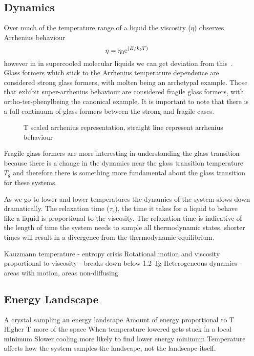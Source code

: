 \subsection{Dynamics}

Over much of the temperature range of a liquid the viscosity ($\eta$) observes Arrhenius behaviour
\begin{equation}
    \eta = \eta_0 \text{e}^{(E/k_bT)}
\end{equation}
however in in supercooled molecular liquids we can get deviation from this~. Glass formers which stick to the Arrhenius temperature dependence are considered strong glass formers, with molten  being an archetypal example. Those that exhibit super-arrhenius behaviour are considered fragile glass formers, with ortho-ter-phenyl\tocheck being the canonical example. It is important to note that there is a full continuum of glass formers between the strong and fragile cases.

\begin{figure}
    \caption{T scaled arrhenius representation, straight line represent arrhenius behaviour}
    \label{fig:angell}
\end{figure}

Fragile glass formers are more interesting in understanding the glass transition because there is a change in the dynamics near the glass transition temperature $T_g$ and therefore there is something more fundamental about the glass transition for these systems. 

As we go to lower and lower temperatures the dynamics of the system slows down dramatically. The relaxation time ($\tau_r$), the time it takes for a liquid to behave like a liquid is proportional to the viscosity. The relaxation time is indicative of the length of time the system needs to sample all thermodynamic states, shorter times will result in a divergence from the thermodynamic equilibrium.


Kauzmann temperature - entropy crisis
Rotational motion and viscosity proportional to viscosity - breaks down below 1.2 Tg
Heterogeneous dynamics - areas with motion, areas non-diffusing

\subsection{Energy Landscape}
A crystal sampling an energy landscape
Amount of energy proportional to T
Higher T more of the space
When temperature lowered gets stuck in a local minimum
Slower cooling more likely to find lower energy minimum
Temperature affects how the system samples the landscape, not the landscape itself.

